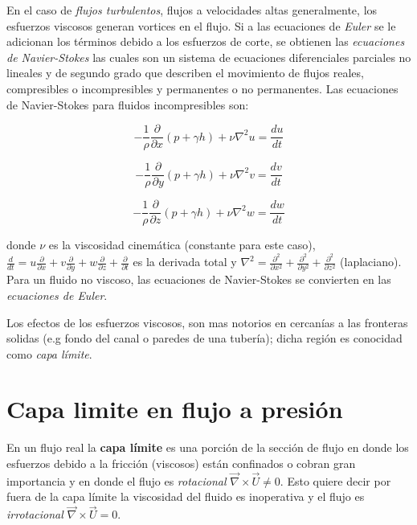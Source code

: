 \documentclass[11pt, oneside]{article}
\begin{document}
En el caso de \emph{flujos turbulentos}, flujos a velocidades altas generalmente, los esfuerzos viscosos generan vortices en el flujo. Si a las ecuaciones de \emph{Euler} se le adicionan los t\'erminos debido a los esfuerzos de corte, se obtienen las \emph{ecuaciones de Navier-Stokes} las cuales son un sistema de ecuaciones diferenciales parciales no lineales y de segundo grado que describen el movimiento de flujos reales, compresibles o incompresibles y permanentes o no permanentes. Las ecuaciones de Navier-Stokes para fluidos incompresibles son:

\begin{equation}
-\frac{1}{\rho}\frac{\partial}{\partial x}(p + \gamma h) + \nu \nabla^2 u = \frac{du}{dt}
\label{nast1}
\end{equation}

\begin{equation}
-\frac{1}{\rho}\frac{\partial}{\partial y}(p + \gamma h) + \nu \nabla^2 v = \frac{dv}{dt}
\label{nast2}
\end{equation}

\begin{equation}
-\frac{1}{\rho}\frac{\partial}{\partial z}(p + \gamma h) + \nu \nabla^2 w = \frac{dw}{dt}
\label{nast3}
\end{equation}

donde $\nu$ es la viscosidad cinem\'atica (constante para este caso), $\frac{d}{dt}=u\frac{\partial}{\partial x}+v\frac{\partial}{\partial y}+w\frac{\partial}{\partial z}+\frac{\partial}{\partial t}$ es la derivada total y $\nabla^2 = \frac{\partial^2}{\partial x^2} + \frac{\partial^2}{\partial y^2} + \frac{\partial^2}{\partial z^2}$ (laplaciano). Para un fluido no viscoso, las ecuaciones de Navier-Stokes se convierten en las \emph{ecuaciones de Euler}.


Los efectos de los esfuerzos viscosos, son mas notorios en cercan\'ias a las fronteras solidas (e.g fondo del canal o paredes de una tuber\'ia); dicha regi\'on es conocidad como \emph{capa l\'imite}. 


\section{Capa limite en flujo a presi\'on} %
En un flujo real  la \textbf{capa l\'imite} es una porci\'on de la secci\'on de flujo en donde los esfuerzos debido a la fricci\'on (viscosos) est\'an confinados o cobran gran importancia y en donde el flujo es \emph{rotacional} $\vec{\nabla} \times  \vec{U} \neq 0$. Esto quiere decir por fuera de la capa l\'imite la viscosidad del fluido es inoperativa y el flujo es \emph{irrotacional}  $\vec{\nabla} \times  \vec{U} = 0$.
\end{document}
